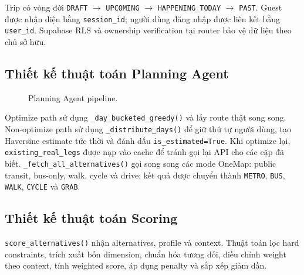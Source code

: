 \documentclass[12pt,a4paper]{article}
\begin{document}
Trip có vòng đời \texttt{DRAFT} \(\rightarrow\) \texttt{UPCOMING} \(\rightarrow\) \texttt{HAPPENING\_TODAY} \(\rightarrow\) \texttt{PAST}. Guest được nhận diện bằng \texttt{session\_id}; người dùng đăng nhập được liên kết bằng \texttt{user\_id}. Supabase RLS và ownership verification tại router bảo vệ dữ liệu theo chủ sở hữu.

\subsection{Thiết kế thuật toán Planning Agent}


\begin{figure}[H]
\centering
{}
\caption{Planning Agent pipeline.}
\label{fig:planning-pipeline}
\end{figure}

Optimize path sử dụng \texttt{\_day\_bucketed\_greedy()} và lấy route thật song song. Non-optimize path sử dụng \texttt{\_distribute\_days()} để giữ thứ tự người dùng, tạo Haversine estimate tức thời và đánh dấu \texttt{is\_estimated=True}. Khi optimize lại, \texttt{existing\_real\_legs} được nạp vào cache để tránh gọi lại API cho các cặp đã biết. \texttt{\_fetch\_all\_alternatives()} gọi song song các mode OneMap: public transit, bus-only, walk, cycle và drive; kết quả được chuyển thành \texttt{METRO}, \texttt{BUS}, \texttt{WALK}, \texttt{CYCLE} và \texttt{GRAB}.

\subsection{Thiết kế thuật toán Scoring}


\texttt{score\_alternatives()} nhận alternatives, profile và context. Thuật toán lọc hard constraints, trích xuất bốn dimension, chuẩn hóa tương đối, điều chỉnh weight theo context, tính weighted score, áp dụng penalty và sắp xếp giảm dần.
\end{document}
